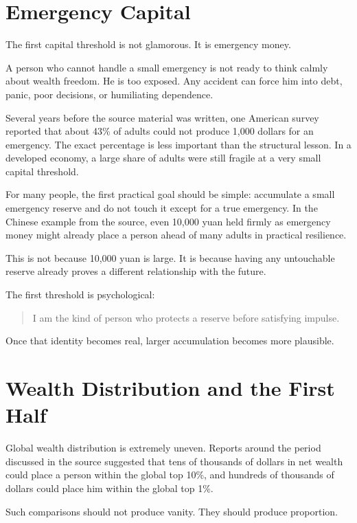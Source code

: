 \section*{Emergency Capital}

The first capital threshold is not glamorous. It is emergency money.

A person who cannot handle a small emergency is not ready to think calmly about wealth freedom. He is too exposed. Any accident can force him into debt, panic, poor decisions, or humiliating dependence.

Several years before the source material was written, one American survey reported that about 43\% of adults could not produce 1,000 dollars for an emergency. The exact percentage is less important than the structural lesson. In a developed economy, a large share of adults were still fragile at a very small capital threshold.

For many people, the first practical goal should be simple: accumulate a small emergency reserve and do not touch it except for a true emergency. In the Chinese example from the source, even 10,000 yuan held firmly as emergency money might already place a person ahead of many adults in practical resilience.

This is not because 10,000 yuan is large. It is because having any untouchable reserve already proves a different relationship with the future.

The first threshold is psychological:

\begin{quote}
I am the kind of person who protects a reserve before satisfying impulse.
\end{quote}

Once that identity becomes real, larger accumulation becomes more plausible.

\section*{Wealth Distribution and the First Half}

Global wealth distribution is extremely uneven. Reports around the period discussed in the source suggested that tens of thousands of dollars in net wealth could place a person within the global top 10\%, and hundreds of thousands of dollars could place him within the global top 1\%.

Such comparisons should not produce vanity. They should produce proportion.

